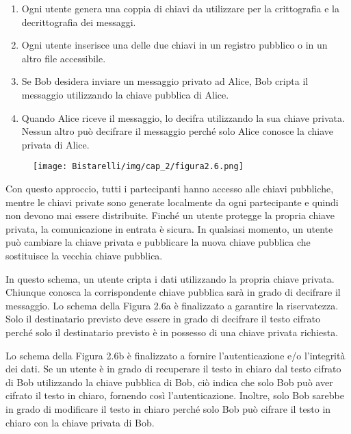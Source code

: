 \begin{enumerate}

    \item Ogni utente genera una coppia di chiavi da utilizzare per la crittografia e la decrittografia dei messaggi.
    
    \item Ogni utente inserisce una delle due chiavi in un registro pubblico o in un altro file accessibile.
    
    \item Se Bob desidera inviare un messaggio privato ad Alice, Bob cripta il messaggio utilizzando la chiave pubblica di Alice.
    
    \item Quando Alice riceve il messaggio, lo decifra utilizzando la sua chiave privata. Nessun altro può decifrare il messaggio perché solo Alice conosce la chiave privata di Alice.
    
\end{enumerate}

\begin{figure}[H]
	\centering
    \texttt{[image: Bistarelli/img/cap\_2/figura2.6.png]}
\end{figure}

Con questo approccio, tutti i partecipanti hanno accesso alle chiavi pubbliche, mentre le chiavi private sono generate localmente da ogni partecipante e quindi non devono mai essere distribuite. Finché un utente protegge la propria chiave privata, la comunicazione in entrata è sicura. In qualsiasi momento, un utente può cambiare la chiave privata e pubblicare la nuova chiave pubblica che sostituisce la vecchia chiave pubblica.

\singlespacing

In questo schema, un utente cripta i dati utilizzando la propria chiave privata. Chiunque conosca la corrispondente chiave pubblica sarà in grado di decifrare il messaggio. Lo schema della Figura 2.6a è finalizzato a garantire la riservatezza. Solo il destinatario previsto deve essere in grado di decifrare il testo cifrato perché solo il destinatario previsto è in possesso di una chiave privata richiesta. 

\singlespacing

Lo schema della Figura 2.6b è finalizzato a fornire l'autenticazione e/o l'integrità dei dati. Se un utente è in grado di recuperare il testo in chiaro dal testo cifrato di Bob utilizzando la chiave pubblica di Bob, ciò indica che solo Bob può aver cifrato il testo in chiaro, fornendo così l'autenticazione. Inoltre, solo Bob sarebbe in grado di modificare il testo in chiaro perché solo Bob può cifrare il testo in chiaro con la chiave privata di Bob. 

